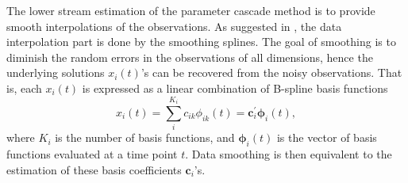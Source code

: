 The lower stream estimation of the parameter cascade method is to provide smooth interpolations of the observations. As suggested in \cite{parcascade}, the data interpolation part is done by the smoothing splines. The goal of smoothing is to diminish the random errors in the observations of all dimensions, hence the underlying solutions $x_{i}(t)$'s can be recovered from the noisy observations. That is, each $x_{i}(t)$ is expressed as a linear combination of B-spline basis functions
\begin{equation*}
     x_{i}(t) = \sum_{i}^{K_{i}} c_{ik} \phi_{ik}(t) = \bm{c}^{\prime}_{i}\bm{\phi}_{i}(t),
\end{equation*}
where $K_{i}$ is the number of basis functions, and $\bm{\phi}_{i}(t)$ is the vector of basis functions evaluated at a time point $t$. Data smoothing is then equivalent to the estimation of these basis coefficients $\bm{c}_{i}$'s. 


